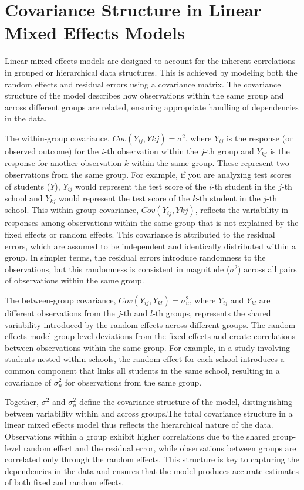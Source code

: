 \section{Covariance Structure in Linear Mixed Effects Models}

Linear mixed effects models are designed to account for the inherent correlations in grouped or hierarchical data structures. This is achieved by modeling both the random effects and residual errors using a covariance matrix. The covariance structure of the model describes how observations within the same group and across different groups are related, ensuring appropriate handling of dependencies in the data.

The within-group covariance, $Cov(Y_{ij},Y{kj})=\sigma^2$, where $Y_{ij}$ is the response (or observed outcome) for the $i$-th observation within the $j$-th group and $Y_{kj}$ is the response for another observation $k$ within the same group. These represent two observations from the same group. For example, if you are analyzing test scores of students ($Y$), $Y_{ij}$ would represent the test score of the $i$-th student in the $j$-th school and $Y_{kj}$ would represent the test score of the $k$-th student in the $j$-th school. This within-group covariance, $Cov(Y_{ij},Y{kj})$, reflects the variability in responses among observations within the same group that is not explained by the fixed effects or random effects. This covariance is attributed to the residual errors, which are assumed to be independent and identically distributed within a group. In simpler terms, the residual errors introduce randomness to the observations, but this randomness is consistent in magnitude ($\sigma^2$) across all pairs of observations within the same group.

The between-group covariance, $Cov(Y_{ij},Y_{kl})=\sigma_u^2$, where $Y_{ij}$ and $Y_{kl}$ are different observations from the $j$-th and $l$-th groups, represents the shared variability introduced by the random effects across different groups. The random effects model group-level deviations from the fixed effects and create correlations between observations within the same group. For example, in a study involving students nested within schools, the random effect for each school introduces a common component that links all students in the same school, resulting in a covariance of $\sigma_u^2$ for observations from the same group.

Together, $\sigma^2$ and $\sigma_u^2$ define the covariance structure of the model, distinguishing between variability within and across groups.The total covariance structure in a linear mixed effects model thus reflects the hierarchical nature of the data. Observations within a group exhibit higher correlations due to the shared group-level random effect and the residual error, while observations between groups are correlated only through the random effects. This structure is key to capturing the dependencies in the data and ensures that the model produces accurate estimates of both fixed and random effects.

